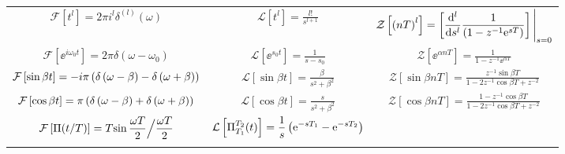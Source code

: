 \documentclass[a4j,10pt]{jarticle}
\def\F{\mathcal F}
\def\Ft{t}
\def\Fw{\omega}
\def\Fof#1{\F\left[#1\right]}
\def\L{\mathcal L}
\def\Lt{t}
\def\Lw{s}
\def\Lof#1{\L\left[#1\right]}
\def\Z{\mathcal Z}
\def\Zt{n}
\def\Zw{z}
\def\Zof#1{\Z\left[#1\right]}
\def\jj{i}
\def\dm{\displaystyle}
\begin{document}
\begin{table}[htbp]
\begin{center}
\begin{tabular}{ccc}
$\dm \Fof{\Ft^l} = 2\pi\jj^l\delta^{(l)}(\Fw)$ &
$\dm \Lof{\Lt^l} = \frac{l!}{\Lw^{l+1}}$ &
$\dm \Zof{\paren{\Zt T}^l} = \left[ \diffn[l]{}{s}\frac 1 {\paren{1-\Zw^{-1}\ee^{sT}}}\right]\Bigg|_{s=0}$
\\
$\dm \Fof{\ee^{\jj\Fw_0\Ft}} = 2\pi\delta(\Fw-\Fw_0)$ &
$\dm \Lof{\ee^{   \Lw_0\Lt}} = \frac 1 {\Lw-\Lw_0}$ &
$\dm \Zof{\ee^{\alpha\Zt T}} = \frac 1 {1 - z^{-1}\ee^{\alpha T}}$
\\
$\dm \Fof{\sin{\beta\Ft}} = -\jj\pi\paren{\delta\paren{\Fw-\beta}-\delta\paren{\Fw+\beta}}$ &
$\dm \Lof{\sin{\beta\Lt}} = \frac{\beta}{\Lw^2+\beta^2}$ &
$\dm \Zof{\sin{\beta\Zt T}} = \frac{\Zw^{-1}\sin{\beta T}}{1-2\Zw^{-1}\cos{\beta T}+\Zw^{-2}}$
\\
$\dm \Fof{\cos{\beta\Ft}} = \pi\paren{\delta\paren{\Fw-\beta}+\delta\paren{\Fw+\beta}}$ &
$\dm \Lof{\cos{\beta\Lt}} = \frac{\Lw}{\Lw^2+\beta^2}$ &
$\dm \Zof{\cos{\beta\Zt T}} = \frac{1-\Zw^{-1}\cos{\beta T}}{1-2\Zw^{-1}\cos{\beta T}+\Zw^{-2}}$
\\
$\dm \Fof{\Pi{\paren{\Ft/T}}} = T{\sin\frac{\Fw T}{2}}\Big/{\frac{\Fw T}{2}}$ &
$\dm \Lof{\Pi_{T_1}^{T_2}{\paren{\Lt}}} = \frac 1 \Lw \paren{\ee^{-\Lw T_1}-\ee^{-\Lw T_2}}$ &
\\
\\\bottomrule
\end{tabular}
\end{center}
\end{table}
\end{document}
